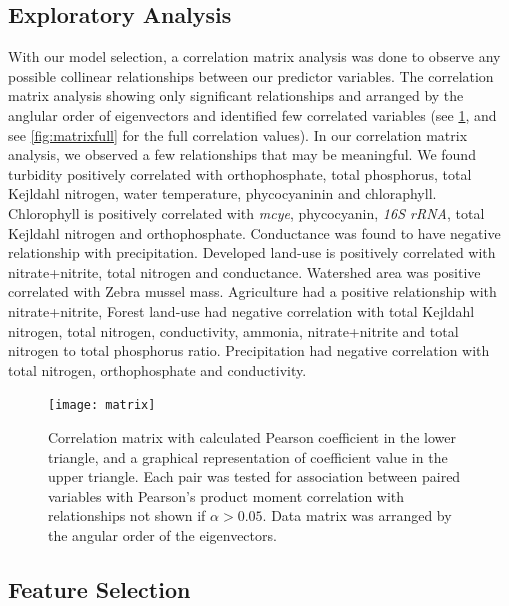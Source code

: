 \clearpage

\subsection{Exploratory Analysis}

With our model selection, a correlation matrix analysis was done to observe any possible collinear relationships between our predictor variables. The correlation matrix analysis showing only significant relationships and arranged by the anglular order of eigenvectors and identified few correlated variables  (see \ref{matrix}, and see \ref{fig:matrixfull} for the full correlation values). In our correlation matrix analysis, we observed a few relationships that may be meaningful. We found turbidity positively correlated with orthophosphate, total phosphorus, total Kejldahl nitrogen, water temperature, phycocyaninin and chloraphyll. Chlorophyll is positively correlated with \emph{mcye}, phycocyanin, \emph{16S rRNA}, total Kejldahl nitrogen and orthophosphate. Conductance was found to have negative relationship with precipitation.
Developed land-use is positively correlated with nitrate+nitrite, total nitrogen and conductance.
Watershed area was positive correlated with Zebra mussel mass.
Agriculture had a positive relationship with nitrate+nitrite,
Forest land-use had negative correlation with total Kejldahl nitrogen, total nitrogen, conductivity, ammonia, nitrate+nitrite and total nitrogen to total phosphorus ratio.
Precipitation had negative correlation with total nitrogen, orthophosphate and conductivity.

\begin{figure}

  \texttt{[image: matrix]}
  \vspace*{-10mm}
  \caption{
  Correlation matrix with calculated Pearson coefficient in the lower triangle, and a graphical representation of coefficient value in the upper triangle. Each pair was tested for association between paired variables with Pearson's product moment correlation with relationships not shown if $\alpha>0.05$. Data matrix was arranged by the angular order of the eigenvectors.}
  \label{matrix}
\end{figure}

\clearpage

\subsection{Feature Selection}

